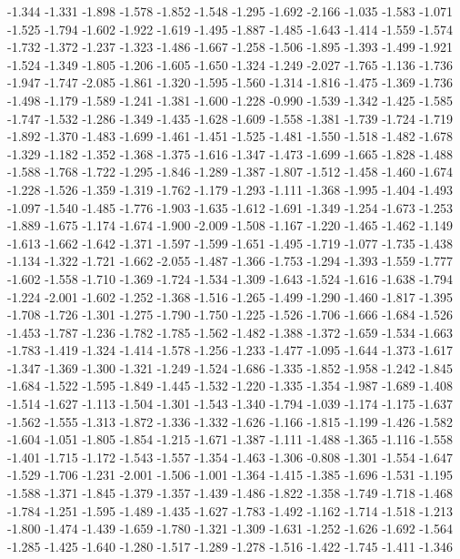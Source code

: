 \documentclass[9pt]{article}
\theoremstyle{plain}
\theoremstyle{definition}
\theoremstyle{remark}
\numberwithin{equation}{section}
\begin{document}
-1.344
-1.331
-1.898
-1.578
-1.852
-1.548
-1.295
-1.692
-2.166
-1.035
-1.583
-1.071
-1.525
-1.794
-1.602
-1.922
-1.619
-1.495
-1.887
-1.485
-1.643
-1.414
-1.559
-1.574
-1.732
-1.372
-1.237
-1.323
-1.486
-1.667
-1.258
-1.506
-1.895
-1.393
-1.499
-1.921
-1.524
-1.349
-1.805
-1.206
-1.605
-1.650
-1.324
-1.249
-2.027
-1.765
-1.136
-1.736
-1.947
-1.747
-2.085
-1.861
-1.320
-1.595
-1.560
-1.314
-1.816
-1.475
-1.369
-1.736
-1.498
-1.179
-1.589
-1.241
-1.381
-1.600
-1.228
-0.990
-1.539
-1.342
-1.425
-1.585
-1.747
-1.532
-1.286
-1.349
-1.435
-1.628
-1.609
-1.558
-1.381
-1.739
-1.724
-1.719
-1.892
-1.370
-1.483
-1.699
-1.461
-1.451
-1.525
-1.481
-1.550
-1.518
-1.482
-1.678
-1.329
-1.182
-1.352
-1.368
-1.375
-1.616
-1.347
-1.473
-1.699
-1.665
-1.828
-1.488
-1.588
-1.768
-1.722
-1.295
-1.846
-1.289
-1.387
-1.807
-1.512
-1.458
-1.460
-1.674
-1.228
-1.526
-1.359
-1.319
-1.762
-1.179
-1.293
-1.111
-1.368
-1.995
-1.404
-1.493
-1.097
-1.540
-1.485
-1.776
-1.903
-1.635
-1.612
-1.691
-1.349
-1.254
-1.673
-1.253
-1.889
-1.675
-1.174
-1.674
-1.900
-2.009
-1.508
-1.167
-1.220
-1.465
-1.462
-1.149
-1.613
-1.662
-1.642
-1.371
-1.597
-1.599
-1.651
-1.495
-1.719
-1.077
-1.735
-1.438
-1.134
-1.322
-1.721
-1.662
-2.055
-1.487
-1.366
-1.753
-1.294
-1.393
-1.559
-1.777
-1.602
-1.558
-1.710
-1.369
-1.724
-1.534
-1.309
-1.643
-1.524
-1.616
-1.638
-1.794
-1.224
-2.001
-1.602
-1.252
-1.368
-1.516
-1.265
-1.499
-1.290
-1.460
-1.817
-1.395
-1.708
-1.726
-1.301
-1.275
-1.790
-1.750
-1.225
-1.526
-1.706
-1.666
-1.684
-1.526
-1.453
-1.787
-1.236
-1.782
-1.785
-1.562
-1.482
-1.388
-1.372
-1.659
-1.534
-1.663
-1.783
-1.419
-1.324
-1.414
-1.578
-1.256
-1.233
-1.477
-1.095
-1.644
-1.373
-1.617
-1.347
-1.369
-1.300
-1.321
-1.249
-1.524
-1.686
-1.335
-1.852
-1.958
-1.242
-1.845
-1.684
-1.522
-1.595
-1.849
-1.445
-1.532
-1.220
-1.335
-1.354
-1.987
-1.689
-1.408
-1.514
-1.627
-1.113
-1.504
-1.301
-1.543
-1.340
-1.794
-1.039
-1.174
-1.175
-1.637
-1.562
-1.555
-1.313
-1.872
-1.336
-1.332
-1.626
-1.166
-1.815
-1.199
-1.426
-1.582
-1.604
-1.051
-1.805
-1.854
-1.215
-1.671
-1.387
-1.111
-1.488
-1.365
-1.116
-1.558
-1.401
-1.715
-1.172
-1.543
-1.557
-1.354
-1.463
-1.306
-0.808
-1.301
-1.554
-1.647
-1.529
-1.706
-1.231
-2.001
-1.506
-1.001
-1.364
-1.415
-1.385
-1.696
-1.531
-1.195
-1.588
-1.371
-1.845
-1.379
-1.357
-1.439
-1.486
-1.822
-1.358
-1.749
-1.718
-1.468
-1.784
-1.251
-1.595
-1.489
-1.435
-1.627
-1.783
-1.492
-1.162
-1.714
-1.518
-1.213
-1.800
-1.474
-1.439
-1.659
-1.780
-1.321
-1.309
-1.631
-1.252
-1.626
-1.692
-1.564
-1.285
-1.425
-1.640
-1.280
-1.517
-1.289
-1.278
-1.516
-1.422
-1.745
-1.411
-1.346
\end{document}
